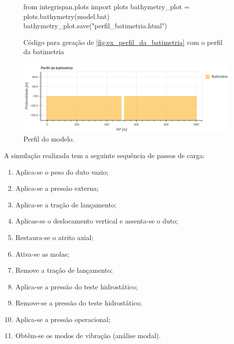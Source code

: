 \begin{figure}[!ht]
\caption{Código para geração de \autoref{fig:ex_perfil_da_batimetria} com o perfil da batimetria}\label{code:perfil-da-batimetria}
\begin{pythoncode}
from integrispan.plots import plots
bathymetry_plot = plots.bathymetry(model.bat)
bathymetry_plot.save("perfil_batimetria.html")
\end{pythoncode}
\end{figure}

\begin{figure}[!ht]
    \centering
    \caption{Perfil do modelo.}\label{fig:ex_perfil_da_batimetria}
    \includegraphics[width=\textwidth]{imagens/exemplo/ex_perfil_da_batimetriat.png}
\end{figure}

A simulação realizada tem a seguinte sequência de passos de carga:

\begin{enumerate}
	\item Aplica-se o peso do duto vazio;
	\item Aplica-se a pressão externa;
	\item Aplica-se a tração de lançamento;
	\item Aplicas-se o deslocamento vertical e assenta-se o duto;
	\item Restaura-se o atrito axial;
	\item Ativa-se as molas;
	\item Remove a tração de lançamento;
	\item Aplica-se a pressão do teste hidrostático;
	\item Remove-se a pressão do teste hidrostático;
	\item Aplica-se a pressão operacional;
	\item Obtêm-se os modos de vibração (análise modal).
\end{enumerate}


